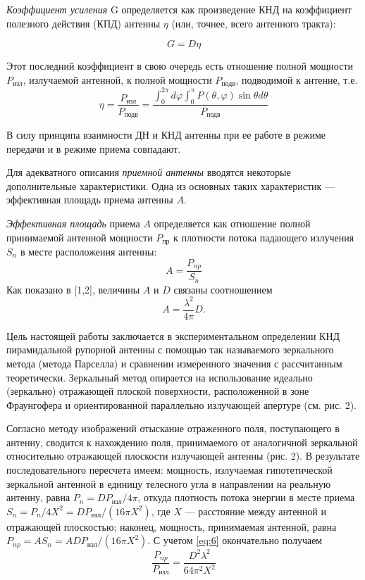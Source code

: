 \textit{Коэффициент усиления} G определяется как произведение КНД на коэффициент полезного действия (КПД) антенны $\eta$
(или, точнее, всего антенного тракта):

\begin{equation}
    G = D\eta
    \label{eq:3}    
\end{equation}

Этот последний коэффициент в свою очередь есть отношение полной мощности $P_{\text{изл}}$, излучаемой антенной, к полной
мощности $P_{\text{подв}}$, подводимой к антенне, т.е.
\begin{equation}
    \eta =\frac{P_{\text{изл}}}{P_{\text{подв}}} = \frac{\int_{0}^{2 \pi} d \varphi \int_{0}^{\pi} P(\theta, \varphi) \sin \theta d \theta}{P_{\text{подв}}}
    \label{eq:4}    
\end{equation}

В силу принципа взаимности ДН и КНД антенны при ее работе в режиме передачи и в режиме приема совпадают.

Для адекватного описания \textit{приемной антенны} вводятся некоторые дополнительные характеристики. 
Одна из основных таких характеристик — эффективная площадь приема антенны $A$.

\textit{Эффективная площадь} приема $A$ определяется как отношение полной принимаемой антенной мощности 
$P_{\text{пр}}$ к плотности потока падающего
излучения $S_n$ в месте расположения антенны:
\begin{equation}
    A = \frac{P_{np}}{S_n}
    \label{eq:5}
\end{equation}
Как показано в [1,2], величины $A$ и $D$ связаны соотношением
\begin{equation}
    A = \frac{\lambda^2}{4\pi}D.
    \label{eq:6}
\end{equation}

Цель настоящей работы заключается в экспериментальном определении КНД пирамидальной рупорной антенны с помощью так 
называемого зеркального метода (метода Парселла) и сравнении измеренного значения с рассчитанным теоретически. 
Зеркальный метод опирается на использование идеально (зеркально) отражающей плоской поверхности, расположенной в зоне 
Фраунгофера и ориентированной параллельно излучающей апертуре (см. рис. 2).

Согласно методу изображений отыскание отраженного поля, поступающего в антенну, сводится к нахождению поля, 
принимаемого от аналогичной зеркальной относительно отражающей плоскости излучающей антенны (рис. 2). В результате 
последовательного пересчета имеем: мощность, излучаемая гипотетической зеркальной антенной в единицу телесного угла 
в направлении на реальную антенну, равна $P_n = D P_{\text{изл}}/4\pi$, откуда плотность потока энергии в месте приема 
$S_n = P_n/4X^2 = D P_{\text{изл}}/(16\pi X^2)$, где $X$ — расстояние между антенной и отражающей плоскостью; наконец, 
мощность, принимаемая антенной, равна $P_{np} =A S_n =A D P_{\text{изл}}/(16\pi X^2)$. С учетом \ref{eq:6} окончательно 
получаем
\begin{equation}
    \frac{P_{np}}{P_{\text{изл}}} = \frac{D^2\lambda^2}{64\pi^2X^2}
    \label{eq:7}
\end{equation}

